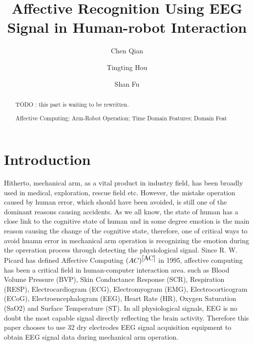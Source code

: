 \documentclass[runningheads,a4paper]{llncs}
\newcommand{\keywords}[1]{\par\addvspace\baselineskip
\noindent\keywordname\enspace\ignorespaces#1}
\begin{document}
\mainmatter

\title{ Affective Recognition Using EEG Signal in Human-robot Interaction }

\author{Chen Qian\and Tingting Hou\and Shan Fu }


\maketitle
\begin{abstract}
TODO : this part is waiting to be rewritten.
\keywords{Affective Computing; Arm-Robot Operation; Time Domain Features;
Domain Feat}
\end{abstract}

\section{Introduction}
Hitherto, mechanical arm, as a vital product in industry field, has been broadly
used in medical, exploration, rescue field etc. However, the mistake operation
caused by human error, which should have been avoided, is still one of the
dominant reasons causing accidents. As we all know, the state of human has a
close link to the cognitive state of human and in some degree emotion is the
main reason causing the change of the cognitive state, therefore, one of
critical ways to avoid huamn error in mechanical arm operation is recognizing
the emotion during the opreration process through detecting the physiological
signal. Since R. W. Picard has defined Affective Computing $(AC)^{\cite{AC}}$
in 1995, affective computing has been a critical field in human-computer
interaction area.  such as Blood Volume Pressure (BVP), Skin Conductance
Response (SCR), Respiration (RESP), Electrocardiogram (ECG), Electromyogram (EMG),
Electrocorticogram (ECoG), Electroencephalogram (EEG), Heart Rate (HR), Oxygen
Saturation (SaO2) and Surface Temperature (ST)\cite{KR}. In all physiological
signals, EEG is no doubt the most capable signal directly reflecting the brain
activity. Therefore this paper chooses to use 32 dry electrodes EEG signal acquisition
equipment to obtain EEG signal data during mechanical arm operation.
\end{document}
